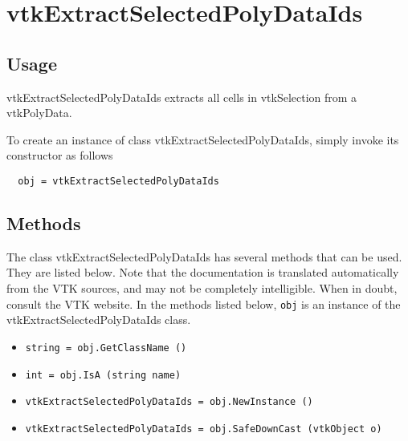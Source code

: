 \section{vtkExtractSelectedPolyDataIds}

\subsection{Usage}

 vtkExtractSelectedPolyDataIds extracts all cells in vtkSelection from a
 vtkPolyData.

To create an instance of class vtkExtractSelectedPolyDataIds, simply
invoke its constructor as follows
\begin{verbatim}
  obj = vtkExtractSelectedPolyDataIds
\end{verbatim}
\subsection{Methods}

The class vtkExtractSelectedPolyDataIds has several methods that can be used.
  They are listed below.
Note that the documentation is translated automatically from the VTK sources,
and may not be completely intelligible.  When in doubt, consult the VTK website.
In the methods listed below, \verb|obj| is an instance of the vtkExtractSelectedPolyDataIds class.
\begin{itemize}
\item  \verb|string = obj.GetClassName ()|

\item  \verb|int = obj.IsA (string name)|

\item  \verb|vtkExtractSelectedPolyDataIds = obj.NewInstance ()|

\item  \verb|vtkExtractSelectedPolyDataIds = obj.SafeDownCast (vtkObject o)|

\end{itemize}
